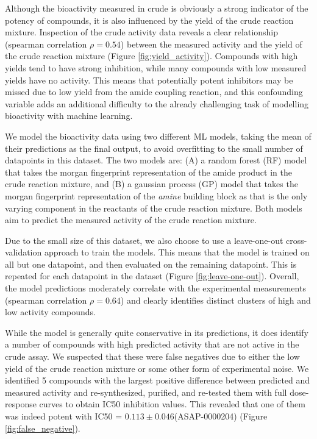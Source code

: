 Although the bioactivity measured in crude is obviously a strong indicator of the potency of compounds, it is also influenced by the yield of the crude reaction mixture. Inspection of the crude activity data reveals a clear relationship (spearman correlation $\rho = 0.54$) between the measured activity and the yield of the crude reaction mixture (Figure \ref{fig:yield_activity}). Compounds with high yields tend to have strong inhibition, while many compounds with low measured yields have no activity. This means that potentially potent inhibitors may be missed due to low yield from the amide coupling reaction, and this confounding variable adds an additional difficulty to the already challenging task of modelling bioactivity with machine learning. 

We model the bioactivity data using two different ML models, taking the mean of their predictions as the final output, to avoid overfitting to the small number of datapoints in this dataset. The two models are: (A) a random forest (RF) model that takes the morgan fingerprint representation of the amide product in the crude reaction mixture, and (B) a gaussian process (GP) model that takes the morgan fingerprint representation of the \textit{amine} building block as that is the only varying component in the reactants of the crude reaction mixture. Both models aim to predict the measured activity of the crude reaction mixture.

Due to the small size of this dataset, we also choose to use a leave-one-out cross-validation approach to train the models. This means that the model is trained on all but one datapoint, and then evaluated on the remaining datapoint. This is repeated for each datapoint in the dataset (Figure \ref{fig:leave-one-out}). Overall, the model predictions moderately correlate with the experimental measurements (spearman correlation $\rho =0.64$) and clearly identifies distinct clusters of high and low activity compounds. 

While the model is generally quite conservative in its predictions, it does identify a number of compounds with high predicted activity that are not active in the crude assay. We suspected that these were false negatives due to either the low yield of the crude reaction mixture or some other form of experimental noise. We identified 5 compounds with the largest positive difference between predicted and measured activity and re-synthesized, purified, and re-tested them with full dose-response curves to obtain IC50 inhibition values. This revealed that one of them was indeed potent with IC50 = $0.113\pm0.046$\uM (ASAP-0000204) (Figure \ref{fig:false_negative}).

